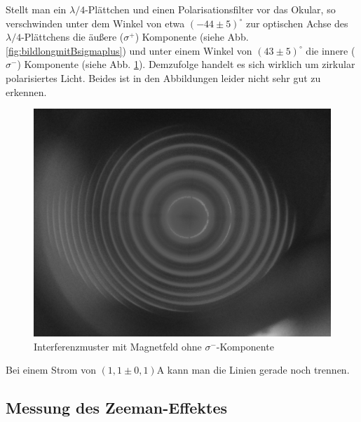 Stellt man ein $\lambda/4$-Plättchen und einen Polarisationsfilter vor das Okular, so verschwinden unter dem Winkel von etwa $(-44 \pm 5)^\circ$ zur optischen Achse des $\lambda/4$-Plättchens die äußere ($\sigma^+$) Komponente (siehe Abb. \ref{fig:bildlongmitBsigmaplus}) und unter einem Winkel von $(43 \pm 5)^\circ$ die innere ($\sigma^-$) Komponente (siehe Abb. \ref{fig:bildlongmitBsigmaminus}). Demzufolge handelt es sich wirklich um zirkular polarisiertes Licht. Beides ist in den Abbildungen leider nicht sehr gut zu erkennen.\\
\begin{figure}
\centering
\includegraphics[scale=0.1]{data/bilder_okular/bild_8_edit.jpg}
\caption{Interferenzmuster mit Magnetfeld ohne $\sigma^-$-Komponente}
\label{fig:bildlongmitBsigmaminus}
\end{figure}
Bei einem Strom von $\si{(1,1\pm 0,1)\ampere}$ kann man die Linien gerade noch trennen.

\subsection{Messung des Zeeman-Effektes}
